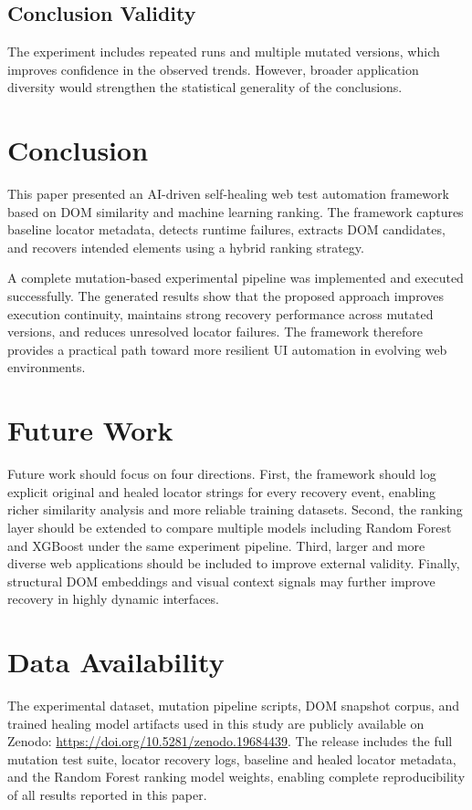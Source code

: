 \documentclass[conference]{IEEEtran}
\begin{document}
\subsection{Conclusion Validity}
The experiment includes repeated runs and multiple mutated versions, which improves confidence in the observed trends. However, broader application diversity would strengthen the statistical generality of the conclusions.

\section{Conclusion}
This paper presented an AI-driven self-healing web test automation framework based on DOM similarity and machine learning ranking. The framework captures baseline locator metadata, detects runtime failures, extracts DOM candidates, and recovers intended elements using a hybrid ranking strategy.

A complete mutation-based experimental pipeline was implemented and executed successfully. The generated results show that the proposed approach improves execution continuity, maintains strong recovery performance across mutated versions, and reduces unresolved locator failures. The framework therefore provides a practical path toward more resilient UI automation in evolving web environments.

\section{Future Work}
Future work should focus on four directions. First, the framework should log explicit original and healed locator strings for every recovery event, enabling richer similarity analysis and more reliable training datasets. Second, the ranking layer should be extended to compare multiple models including Random Forest and XGBoost under the same experiment pipeline. Third, larger and more diverse web applications should be included to improve external validity. Finally, structural DOM embeddings and visual context signals may further improve recovery in highly dynamic interfaces.

\section*{Data Availability}

The experimental dataset, mutation pipeline scripts, DOM snapshot corpus, and trained healing model artifacts used in this study are publicly available on Zenodo: \url{https://doi.org/10.5281/zenodo.19684439}. The release includes the full mutation test suite, locator recovery logs, baseline and healed locator metadata, and the Random Forest ranking model weights, enabling complete reproducibility of all results reported in this paper.
\end{document}
